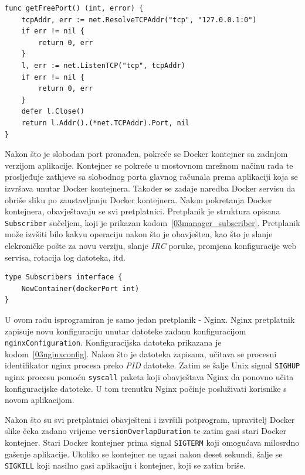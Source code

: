 \begin{lstlisting}[float=h]
func getFreePort() (int, error) {
	tcpAddr, err := net.ResolveTCPAddr("tcp", "127.0.0.1:0")
	if err != nil {
		return 0, err
	}
	l, err := net.ListenTCP("tcp", tcpAddr)
	if err != nil {
		return 0, err
	}
	defer l.Close()
	return l.Addr().(*net.TCPAddr).Port, nil
}
\end{lstlisting}

Nakon što je slobodan port pronađen, pokreće se Docker kontejner sa zadnjom verzijom aplikacije.
Kontejner se pokreće u mostovnom mrežnom načinu rada te prosljeđuje zathjeve sa slobodnog porta
glavnog računala prema aplikaciji koja se izvršava unutar Docker kontejnera. Također se zadaje
naredba Docker servisu da obriše sliku po zaustavljanju Docker kontejnera. Nakon pokretanja Docker
kontejnera, obavještavaju se svi pretplatnici. Pretplanik je struktura opisana \texttt{Subscriber}
sučeljem, koji je prikazan kodom~\ref{03manager_subscriber}. Pretplanik može izvšiti bilo kakvu
operaciju nakon što je obavješten, kao što je slanje elekroničke pošte za novu verziju, slanje
\textit{IRC} poruke, promjena konfiguracije web servisa, rotacija log datoteka, itd.

\begin{lstlisting}[float=h]
type Subscribers interface {
	NewContainer(dockerPort int)
}
\end{lstlisting}

U ovom radu isprogramiran je samo jedan pretplanik - Nginx. Nginx pretplatnik zapisuje novu
konfiguraciju unutar datoteke zadanu konfiguracijom \texttt{nginxConfiguration}. Konfiguracijska
datoteka prikazana je kodom~\ref{03nginxconfig}. Nakon što je datoteka zapisana, učitava se procesni
identifikator nginx procesa preko \textit{PID} datoteke. Zatim se šalje Unix signal \texttt{SIGHUP}
nginx procesu pomoću \texttt{syscall} paketa koji obavještava Nginx da ponovno učita konfiguracijske
datoteke. U tom trenutku Nginx počinje posluživati korisnike s novom aplikacijom.

Nakon što su svi pretplatnici obavješteni i izvršili potprogram, upravitelj Docker slike čeka zadano
vrijeme \texttt{versionOverlapDuration} te zatim gasi stari Docker kontejner. Stari Docker kontejner
prima signal \texttt{SIGTERM} koji omogućava milosrdno gašenje aplikacije. Ukoliko se kontejner ne
ugasi nakon deset sekundi, šalje se \texttt{SIGKILL} koji nasilno gasi aplikaciju i kontejner, koji
se zatim briše.

